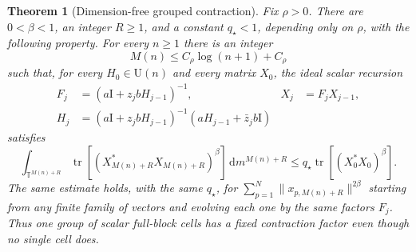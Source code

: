 \documentclass[11pt]{article}
\newtheorem{theorem}{Theorem}[section]
\theoremstyle{remark}
\newcommand{\T}{\mathbb T}
\newcommand{\Id}{\mathrm I}
\newcommand{\dd}{\,\mathrm d}
\newcommand{\tr}{\operatorname{tr}}
\newcommand{\U}{\mathrm U}
\begin{document}
\begin{theorem}[Dimension-free grouped contraction]
\label{thm:grouped-ideal-contraction}
Fix $\rho>0$.  There are $0<\beta<1$, an integer $R\geq1$, and a constant
$q_\star<1$, depending only on $\rho$, with the following property.  For
every $n\geq1$ there is an integer
\begin{equation}
 M(n)\leq C_\rho\log(n+1)+C_\rho
 \label{eq:burnin-log-dimension}
\end{equation}
such that, for every $H_0\in\U(n)$ and every matrix $X_0$, the ideal scalar
recursion
\begin{align}
 F_j&=(a\Id+z_jbH_{j-1})^{-1},
 &X_j&=F_jX_{j-1},                                      \label{eq:grouped-X-recursion}\\
 H_j&=(a\Id+z_jbH_{j-1})^{-1}
       (aH_{j-1}+\bar z_jb\Id)                          \label{eq:grouped-H-recursion}
\end{align}
satisfies
\begin{equation}
 \int_{\T^{M(n)+R}}
  \tr\!\left[(X_{M(n)+R}^*X_{M(n)+R})^\beta\right]
  \dd m^{M(n)+R}
 \leq q_\star\tr\!\left[(X_0^*X_0)^\beta\right].
 \label{eq:grouped-dimension-free-contraction}
\end{equation}
The same estimate holds, with the same $q_\star$, for
$\sum_{p=1}^N\|x_{p,M(n)+R}\|^{2\beta}$ starting from any finite family of
vectors and evolving each one by the same factors $F_j$.
Thus one \emph{group} of scalar full-block cells has a fixed contraction
factor even though no single cell does.
\end{theorem}
\end{document}
